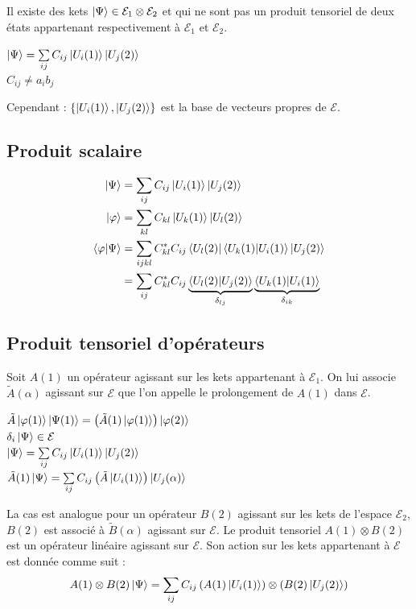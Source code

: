 \documentclass[12pt,a4paper,titlepage]{book}
\begin{document}
Il existe des kets $\ket\Psi \in \mathcal{E}_1 \otimes \mathcal{E}_2$ et qui ne sont pas un produit tensoriel de deux états appartenant respectivement à $\mathcal{E}_1$ et $\mathcal{E}_2$.

\begin{center}
$\ket\Psi = \sum\limits_{i j} C_{i j} \ket{U_i (1)} \ket{U_j (2)}$\\
$C_{i j} \neq a_i b_j$
\end{center}

Cependant : $\lbrace \ket{U_i (1)}, \ket{U_j (2)} \rbrace$ est la base de vecteurs propres de $\mathcal{E}$.

\subsection{Produit scalaire}

\begin{align*}
\ket\Psi &= \sum\limits_{i j} C_{i j} \ket{U_i (1)} \ket{U_j (2)}\\
\ket\varphi &= \sum\limits_{k l} C_{k l} \ket{U_k (1)} \ket{U_l (2)}\\
\braket{\varphi \vert \Psi} &= \sum\limits_{i j k l} C_{k l}^* C_{i j} \bra{U_l (2)} \braket{U_k (1) \vert U_i (1)} \ket{U_j (2)}\\
&= \sum\limits_{i j} C_{k l}^* C_{i j} \underbrace{\braket{U_l (2) \vert U_j (2)}}_{\delta_{l j}} \underbrace{\braket{U_k (1) \vert U_i (1)}}_{\delta_{i k}}
\end{align*}

\subsection{Produit tensoriel d'opérateurs}

Soit $A(1)$ un opérateur agissant sur les kets appartenant à $\mathcal{E}_1$. On lui associe $\tilde{A}(\alpha)$ agissant sur $\mathcal{E}$ que l'on appelle le prolongement de $A(1)$ dans $\mathcal{E}$.
\begin{center}
$\tilde{A} \ket{\varphi (1)} \ket{\Psi (1)} = \left( \tilde{A} (1) \ket{\varphi (1)} \right) \ket{\varphi (2)}$\\
$\delta_i \ket\Psi \in \mathcal{E}$\\
$\ket\Psi = \sum\limits_{i j} C_{i j} \ket{U_i (1)} \ket{U_j (2)}$\\
$\tilde{A}(1) \ket\Psi = \sum\limits_{i j} C_{i j} \left( \tilde{A} \ket{U_i (1)} \right) \ket{U_j (\alpha)}$
\end{center}
La cas est analogue pour un opérateur $B(2)$ agissant sur les kets de l'espace $\mathcal{E}_2$, $B(2)$ est associé à $\tilde{B} (\alpha)$ agissant sur $\mathcal{E}$. Le produit tensoriel $A(1) \otimes B(2)$ est un opérateur linéaire agissant sur $\mathcal{E}$. Son action sur les kets appartenant à $\mathcal{E}$ est donnée comme suit :
\begin{equation*}
A(1) \otimes B(2) \ket\Psi = \sum\limits_{i j} C_{i j} \left( A(1) \ket{U_i (1)} \right) \otimes \left( B(2) \ket{U_j (2)} \right)
\end{equation*}
\end{document}
